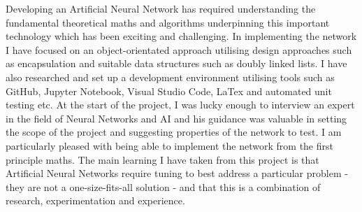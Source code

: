 \documentclass[./project-report/src/latex/project-report.tex]{subfiles}
\begin{document}
Developing an Artificial Neural Network has required understanding the fundamental theoretical maths and algorithms underpinning this important technology which has been 
exciting and challenging. In implementing the network I have focused on an object-orientated approach utilising design approaches such as encapsulation and suitable data 
structures such as doubly linked lists. I have also researched and set up a development environment utilising tools such as GitHub, Jupyter Notebook, Visual Studio Code, 
LaTex and automated unit testing etc. At the start of the project, I was lucky enough to interview an expert in the field of Neural Networks and AI and his guidance was 
valuable in setting the scope of the project and suggesting properties of the network to test. I am particularly pleased with being able to implement the network from the 
first principle maths. The main learning I have taken from this project is that Artificial Neural Networks require tuning to best address a particular problem - they are not a 
one-size-fits-all solution - and that this is a combination of research, experimentation and experience.

\pagebreak
\end{document}
